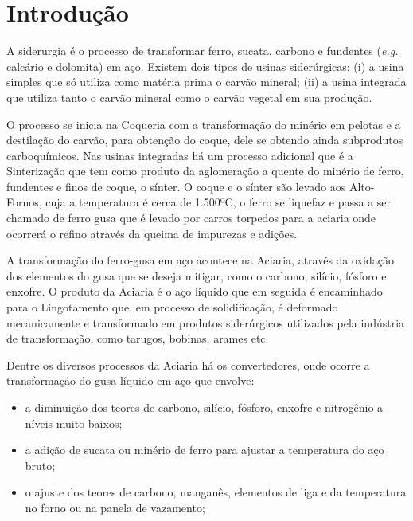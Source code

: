 \chapter[Introdução]{Introdução}

 A siderurgia é o processo de transformar ferro, sucata, carbono e fundentes (\textit{e.g.} calcário e dolomita) em aço. Existem dois tipos de usinas siderúrgicas: (i) a usina simples que só utiliza como matéria prima o carvão mineral; (ii) a usina integrada que utiliza tanto o carvão mineral como o carvão vegetal em sua produção.
 
 O processo se inicia na Coqueria com a transformação do minério em pelotas e a destilação do carvão, para obtenção do coque, dele se obtendo ainda subprodutos carboquímicos.
%
 Nas usinas integradas há um processo adicional que é a Sinterização que tem como produto da aglomeração a quente do minério de ferro, fundentes e finos de coque, o sínter.
%
 O coque e o sínter são levado aos Alto-Fornos, cuja a temperatura é cerca de 1.500ºC, o ferro se liquefaz e passa a ser chamado de ferro gusa que é levado por carros torpedos para a aciaria onde ocorrerá o refino através da queima de impurezas e adições.
  
A transformação do ferro-gusa em aço acontece na Aciaria, através da oxidação dos elementos do gusa que se deseja mitigar, como o carbono, silício, fósforo e enxofre. O produto da Aciaria é o aço líquido que em seguida é encaminhado para o Lingotamento que, em processo de solidificação, é deformado mecanicamente e transformado em produtos siderúrgicos utilizados pela indústria de transformação, como tarugos, bobinas, arames etc. \cite{aco}

 Dentre os diversos processos da Aciaria há os convertedores, onde ocorre a transformação do gusa líquido em aço que envolve:

\begin{itemize}
	\item a diminuição dos teores de carbono, silício, fósforo, enxofre e nitrogênio a níveis muito baixos;
	\item a adição de sucata ou minério de ferro para ajustar a temperatura do aço bruto;
	\item o ajuste dos teores de carbono, manganês, elementos de liga e da temperatura no forno ou na panela de vazamento;
\end{itemize}

